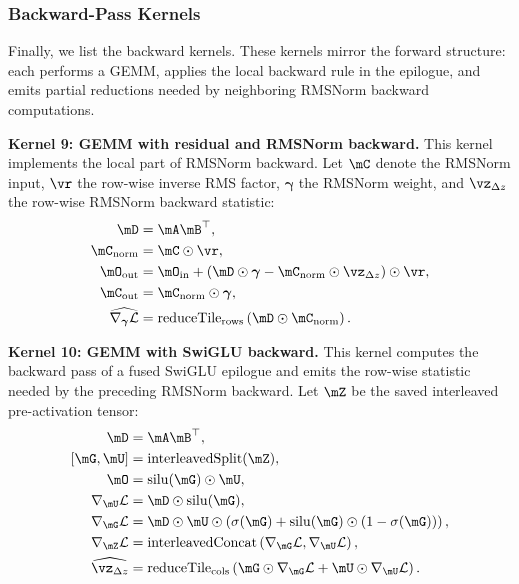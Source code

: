 \subsubsection{Backward-Pass Kernels}

Finally, we list the backward kernels. These kernels mirror the forward structure: each performs a GEMM, applies the local backward rule in the epilogue, and emits partial reductions needed by neighboring RMSNorm backward computations.

\textbf{Kernel 9: GEMM with residual and RMSNorm backward.}
This kernel implements the local part of RMSNorm backward. Let $\mC$ denote the RMSNorm input, $\vr$ the row-wise inverse RMS factor, $\boldsymbol{\gamma}$ the RMSNorm weight, and $\vz_{\Delta z}$ the row-wise RMSNorm backward statistic:
\begin{align*}
\mD &= \mA\mB^{\top}, \\
\mC_{\mathrm{norm}} &= \mC \odot \vr, \\
\mO_{\mathrm{out}}
&=
\mO_{\mathrm{in}}
+
\left(
\mD \odot \boldsymbol{\gamma}
-
\mC_{\mathrm{norm}} \odot \vz_{\Delta z}
\right)
\odot \vr, \\
\mC_{\mathrm{out}}
&=
\mC_{\mathrm{norm}} \odot \boldsymbol{\gamma}, \\
\widehat{\nabla_{\boldsymbol{\gamma}}\mathcal{L}}
&=
\operatorname{reduceTile}_{\mathrm{rows}}
\left(
\mD \odot \mC_{\mathrm{norm}}
\right).
\end{align*}

\textbf{Kernel 10: GEMM with SwiGLU backward.}
This kernel computes the backward pass of a fused SwiGLU epilogue and emits the row-wise statistic needed by the preceding RMSNorm backward. Let $\mZ$ be the saved interleaved pre-activation tensor:
\begin{align*}
\mD &= \mA\mB^{\top}, \\
[\mG,\mU] &= \operatorname{interleavedSplit}(\mZ), \\
\mO &= \operatorname{silu}(\mG) \odot \mU, \\
\nabla_{\mU}\mathcal{L}
&=
\mD \odot \operatorname{silu}(\mG), \\
\nabla_{\mG}\mathcal{L}
&=
\mD \odot \mU \odot
\left(
\sigma(\mG)
+
\operatorname{silu}(\mG) \odot (1-\sigma(\mG))
\right), \\
\nabla_{\mZ}\mathcal{L}
&=
\operatorname{interleavedConcat}
\left(
\nabla_{\mG}\mathcal{L},
\nabla_{\mU}\mathcal{L}
\right), \\
\widehat{\vz_{\Delta z}}
&=
\operatorname{reduceTile}_{\mathrm{cols}}
\left(
\mG \odot \nabla_{\mG}\mathcal{L}
+
\mU \odot \nabla_{\mU}\mathcal{L}
\right).
\end{align*}

